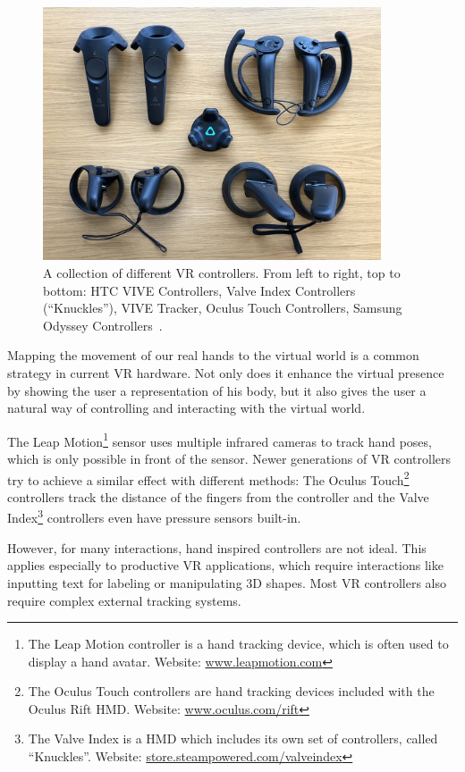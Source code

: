 \begin{figure}[H]%
	\centering%
	\includegraphics[width=10cm]{figures/introduction/vr_controllers.jpg}%
	\caption[Collection of VR controllers]{A collection of different \gls{VR} controllers. From left to right, top to bottom: HTC VIVE Controllers, Valve Index Controllers (\enquote{Knuckles}), VIVE Tracker, Oculus Touch Controllers, Samsung Odyssey Controllers~\cite{Yang.2018}.}\label{fig:vr-controllers}
\end{figure}

Mapping the movement of our real hands to the virtual world is a common strategy in current \gls{VR} hardware. Not only does it enhance the virtual presence by showing the user a representation of his body, but it also gives the user a natural way of controlling and interacting with the virtual world.

The Leap Motion\footnote{The Leap Motion controller is a hand tracking device, which is often used to display a hand avatar. Website: \href{https://www.leapmotion.com/}{www.leapmotion.com}} sensor uses multiple infrared cameras to track hand poses, which is only possible in front of the sensor. Newer generations of \gls{VR} controllers try to achieve a similar effect with different methods: The Oculus Touch\footnote{The Oculus Touch controllers are hand tracking devices included with the Oculus Rift \gls{HMD}. Website: \href{https://www.oculus.com/rift/}{www.oculus.com/rift}} controllers track the distance of the fingers from the controller and the Valve Index\footnote{The Valve Index is a \gls{HMD} which includes its own set of controllers, called \enquote{Knuckles}. Website: \href{https://store.steampowered.com/valveindex}{store.steampowered.com/valveindex}} controllers even have pressure sensors built-in.

However, for many interactions, hand inspired controllers are not ideal. This applies especially to productive \gls{VR} applications, which require interactions like inputting text for labeling or manipulating \gls{3D} shapes. Most \gls{VR} controllers also require complex external tracking systems.


